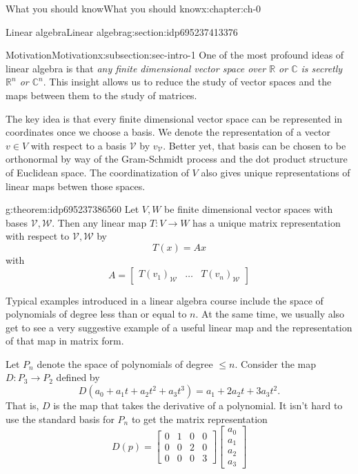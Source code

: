 \documentclass[oneside,10pt,]{book}
\numberwithin{equation}{section}
\newcommand{\C}{\mathbb{C}}
\newcommand{\R}{\mathbb{R}}
\newcommand\bbm{\begin{bmatrix}}
\newcommand\ebm{\end{bmatrix}}
\numberwithin{equation}{section}
\newcommand{\amp}{&}
\begin{document}
\begin{chapterptx}{What you should know}{}{What you should know}{}{}{x:chapter:ch-0}
\begin{sectionptx}{Linear algebra}{}{Linear algebra}{}{}{g:section:idp695237413376}
%
%
\typeout{************************************************}
\typeout{************************************************}
%
\begin{subsectionptx}{Motivation}{}{Motivation}{}{}{x:subsection:sec-intro-1}
One of the most profound ideas of linear algebra is that \emph{any finite dimensional vector space over \(\R\) or \(\C\) is secretly \(\R^n\) or \(\C^n\)}. This insight allows us to reduce the study of vector spaces and the maps between them to the study of matrices.%
\par
The key idea is that every finite dimensional vector space can be represented in coordinates once we choose a basis. We denote the representation of a vector \(v \in V\) with respect to a basis \(\mathcal V\) by \(v_\mathcal{V}\). Better yet, that basis can be chosen to be orthonormal by way of the Gram-Schmidt process and the dot product structure of Euclidean space. The coordinatization of \(V\) also gives unique representations of linear maps betwen those spaces.%
\begin{theorem}{}{}{g:theorem:idp695237386560}%
Let \(V, W\) be finite dimensional vector spaces with bases \(\mathcal V, \mathcal W\). Then any linear map \(T: V \to W\) has a unique matrix representation with respect to \(\mathcal V, \mathcal W\) by%
\begin{equation*}
T(x) = A x
\end{equation*}
with%
\begin{equation*}
A = \bbm T(v_1)_{\mathcal W} \amp \ldots \amp T(v_n)_{\mathcal W} \ebm
\end{equation*}
%
\end{theorem}
Typical examples introduced in a linear algebra course include the space of polynomials of degree less than or equal to \(n\). At the same time, we usually also get to see a very suggestive example of a useful linear map and the representation of that map in matrix form.%
\par
Let \(P_n\) denote the space of polynomials of degree \(\leq n\). Consider the map \(D: P_3 \to P_2\) defined by%
\begin{equation*}
D(a_0 + a_1 t + a_2 t^2 + a_3 t^3) = a_1 + 2 a_2 t + 3 a_3 t^2.
\end{equation*}
That is, \(D\) is the map that takes the derivative of a polynomial. It isn't hard to use the standard basis for \(P_n\) to get the matrix representation%
\begin{equation*}
D(p) = \bbm 0 \amp 1 \amp 0 \amp 0 \\ 0 \amp 0 \amp 2 \amp 0 \\ 0 \amp 0 \amp 0 \amp 3 \ebm \bbm a_0 \\ a_1 \\ a_2 \\ a_3 \ebm

\end{equation*}
\end{subsectionptx}
\end{sectionptx}
\end{chapterptx}
\end{document}
